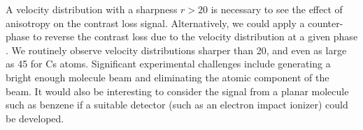 A velocity distribution with a sharpness $r> 20$ is necessary to see the effect of anisotropy on the contrast loss signal. Alternatively, we could apply a counter-phase to reverse the contrast loss due to the velocity distribution at a given phase \cite{Rob04,Rob02}. We routinely observe velocity distributions sharper than 20, and even as large as 45 for Cs atoms. Significant experimental challenges include generating a bright enough molecule beam and eliminating the atomic component of the beam. It would also be interesting to consider the signal from a planar molecule such as benzene if a suitable detector (such as an electron impact ionizer) could be developed.



